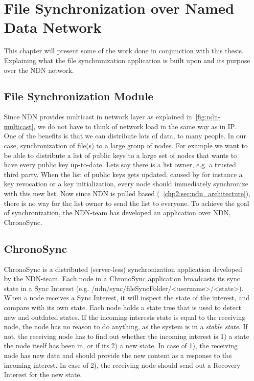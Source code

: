 \chapter{File Synchronization over Named Data Network}\label{chp3:application}
This chapter will present some of the work done in conjunction with this thesis. 
Explaining what the file synchronization application is built upon and its purpose over the \gls{NDN} network. 

\section{File Synchronization Module}\label{file-sync}
Since \gls{NDN} provides multicast in network layer as explained in~\autoref{fig:ndn-multicast}, we do not have to think of network load in the same way as in \gls{IP}.  
One of the benefits is that we can distribute lots of data, to many people. 
In our case, synchronization of file(s) to a large group of nodes. 
For example we want to be able to distribute a list of public keys to a large set of nodes that wants to have every public key up-to-date.
Lets say there is a list owner, e.g. a trusted third party. 
When the list of public keys gets updated, caused by for instance a key revocation or a key initialization, every node should immediately synchronize with this new list.
Now since \gls{NDN} is pulled based (~\autoref{chp2:sec:ndn_architecture}), there is no way for the list owner to send the list to everyone.
To achieve the goal of synchronization, the \gls{NDN}-team has developed an application over \gls{NDN}, ChronoSync.

\section{ChronoSync}\label{chronosync}
ChronoSync is a distributed (server-less) synchronization application developed by the \gls{NDN}-team. 
Each node in a ChronoSync application broadcasts its sync state in a Sync Interest (e.g. /ndn/sync/fileSyncFolder/<username>/<state>).
When a node receives a Sync Interest, it will inspect the state of the interest, and compare with its own state.
Each node holds a state tree that is used to detect new and outdated states.
If the incoming interests state is equal to the receiving node, the node has no reason to do anything, as the system is in a \textit{stable state}.
If not, the receiving node has to find out whether the incoming interest is 1) a state the node itself has been in, or if its 2) a new state.
In case of 1), the receiving node has new data and should provide the new content as a response to the incoming interest. In case of 2), the receiving node should send out a Recovery Interest for the new state.

